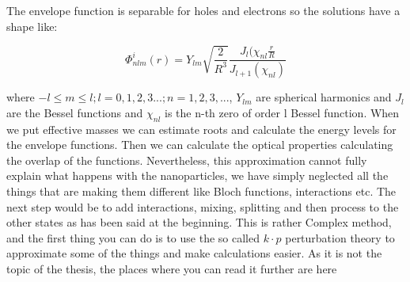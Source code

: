 The envelope function is separable for holes and electrons so the solutions have a shape like:

\begin{equation}
\Phi _{nlm} ^i(r) = Y_{lm} \sqrt{\frac{2}{R^3}} \frac{J_l(\chi _{nl}\frac{r}{R}}{J_{l+1}(\chi _{nl})}
\end{equation}

where $-l \leq m \leq l; l = 0,1,2,3...; n = 1,2,3,...$, $Y_{lm}$ are spherical harmonics and $J_l$ are the Bessel functions and $\chi _{nl}$ is the n-th zero of order l Bessel function. When we put effective masses we can estimate roots and calculate the energy levels for the envelope functions. Then we can calculate the optical properties calculating the overlap of the functions. Nevertheless, this approximation cannot fully explain what happens with the nanoparticles, we have simply neglected all the things that are making them different like Bloch functions, interactions etc. The next step would be to add interactions, mixing, splitting and then process to the other states as has been said at the beginning. This is rather Complex method, and the first thing you can do is to use the so called $k\cdot p$ perturbation theory to approximate some of the things and make calculations easier. As it is not the topic of the thesis, the places where you can read it further are here \cite{Klimov} \cite{ulrike} \cite{fox} \cite{dotsy}